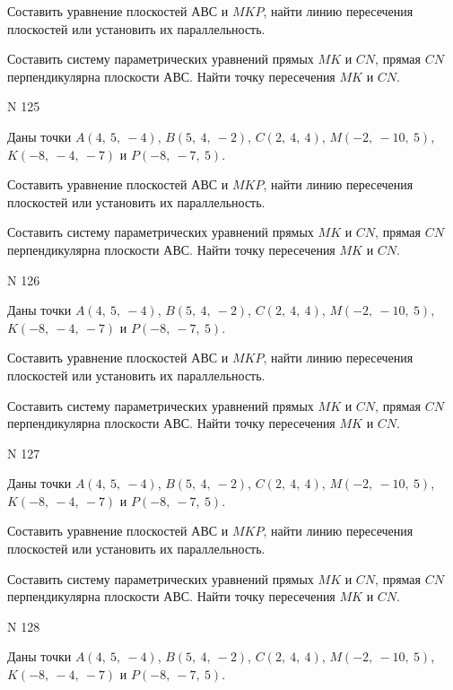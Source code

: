 \documentclass[11pt]{report}
\begin{document}
Составить уравнение плоскостей $АВС$ и $MKP$,
найти линию пересечения плоскостей или установить их параллельность.

Составить систему параметрических уравнений прямых $MK$ и $CN$,
прямая $CN$ перпендикулярна плоскости $АВС$. 
Найти точку пересечения $MK$ и $CN$.



 N 125

Даны точки $A\left( 4, \  5, \  -4\right)$, $B\left( 5, \  4, \  -2\right)$, $C\left( 2, \  4, \  4\right)$, $M\left( -2, \  -10, \  5\right)$, $K\left( -8, \  -4, \  -7\right)$ и $P\left( -8, \  -7, \  5\right)$.


Составить уравнение плоскостей $АВС$ и $MKP$,
найти линию пересечения плоскостей или установить их параллельность.

Составить систему параметрических уравнений прямых $MK$ и $CN$,
прямая $CN$ перпендикулярна плоскости $АВС$. 
Найти точку пересечения $MK$ и $CN$.



 N 126

Даны точки $A\left( 4, \  5, \  -4\right)$, $B\left( 5, \  4, \  -2\right)$, $C\left( 2, \  4, \  4\right)$, $M\left( -2, \  -10, \  5\right)$, $K\left( -8, \  -4, \  -7\right)$ и $P\left( -8, \  -7, \  5\right)$.


Составить уравнение плоскостей $АВС$ и $MKP$,
найти линию пересечения плоскостей или установить их параллельность.

Составить систему параметрических уравнений прямых $MK$ и $CN$,
прямая $CN$ перпендикулярна плоскости $АВС$. 
Найти точку пересечения $MK$ и $CN$.



 N 127

Даны точки $A\left( 4, \  5, \  -4\right)$, $B\left( 5, \  4, \  -2\right)$, $C\left( 2, \  4, \  4\right)$, $M\left( -2, \  -10, \  5\right)$, $K\left( -8, \  -4, \  -7\right)$ и $P\left( -8, \  -7, \  5\right)$.


Составить уравнение плоскостей $АВС$ и $MKP$,
найти линию пересечения плоскостей или установить их параллельность.

Составить систему параметрических уравнений прямых $MK$ и $CN$,
прямая $CN$ перпендикулярна плоскости $АВС$. 
Найти точку пересечения $MK$ и $CN$.



 N 128

Даны точки $A\left( 4, \  5, \  -4\right)$, $B\left( 5, \  4, \  -2\right)$, $C\left( 2, \  4, \  4\right)$, $M\left( -2, \  -10, \  5\right)$, $K\left( -8, \  -4, \  -7\right)$ и $P\left( -8, \  -7, \  5\right)$.
\end{document}
